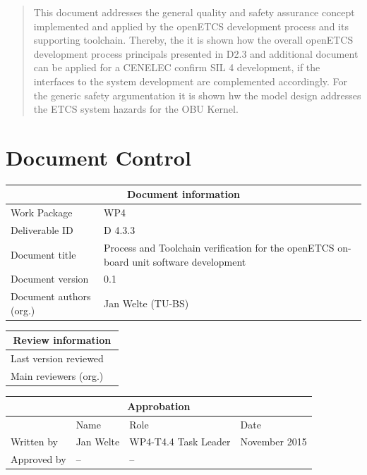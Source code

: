 \documentclass{template/openetcs_report}
\begin{document}
\begin{abstract}
This document addresses the general quality and safety assurance concept implemented and applied by the openETCS development process and its supporting toolchain. Thereby, the it is shown how the overall openETCS development process principals presented in D2.3 and  additional document can be applied for a CENELEC confirm SIL 4 development, if the interfaces to the system development are complemented accordingly. For the generic safety argumentation it is shown hw the model design addresses the ETCS system hazards for the OBU Kernel.

\end{abstract}

\maketitle
\tableofcontents
\listoffiguresandtables
\newpage

\chapter{Document Control}

\begin{tabular}{|p{4.4cm}|p{8.7cm}|}
\hline
\multicolumn{2}{|c|}{Document information} \\
\hline
Work Package &  WP4  \\
Deliverable ID & D 4.3.3\\
\hline
Document title & Process and Toolchain verification for the openETCS on-board unit software development \\
Document version & 0.1 \\
Document authors (org.)  & Jan Welte (TU-BS)\\
\hline
\end{tabular}

\begin{tabular}{|p{4.4cm}|p{8.7cm}|}
\hline
\multicolumn{2}{|c|}{Review information} \\
\hline
Last version reviewed & \\
\hline
Main reviewers (org.) & \\
\hline
\end{tabular}

\begin{tabular}{|p{2.2cm}|p{4cm}|p{4cm}|p{2cm}|}
\hline
\multicolumn{4}{|c|}{Approbation} \\
\hline
  &  Name & Role & Date   \\
\hline  
Written by    &  Jan Welte & WP4-T4.4 Task Leader  &  November 2015\\
\hline
Approved by & -- & -- & \\
\hline
\end{tabular}
\end{document}
